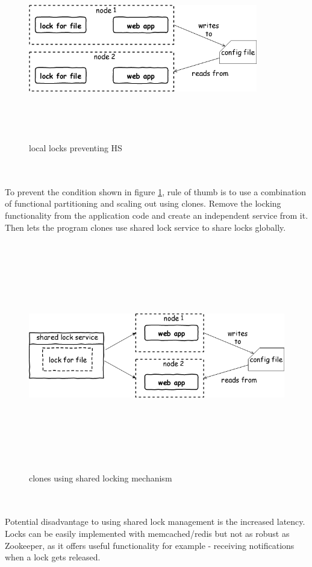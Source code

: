 \begin{figure}[h!]
  \centering
  \includegraphics[width=10cm,height=8cm,keepaspectratio]{../media/crawler/wrng-local-locks.png}
  \caption{local locks preventing HS \cite{manstate}}
  \label{fig:wrnglocks}
\end{figure}
\\
\\
\noindent
To prevent the condition shown in figure \ref{fig:wrnglocks}, rule of thumb is to
use a combination of functional partitioning and scaling out using clones. Remove
the locking functionality from the application code and create an independent
service from it. Then lets the program clones use shared lock service to share
locks globally.

\pagebreak

\begin{figure}[h!]
  \centering
  \includegraphics[width=13cm,height=10cm,keepaspectratio]{../media/crawler/rght-shared-locks.png}
  \caption{clones using shared locking mechanism \cite{manstate}}
  \label{fig:rghtlocks}
\end{figure}
\\
\\
\noindent
Potential disadvantage to using shared lock management is the increased latency.
Locks can be easily implemented with memcached/redis but not as robust as Zookeeper,
as it offers useful functionality for example - receiving notifications when a
lock gets released.